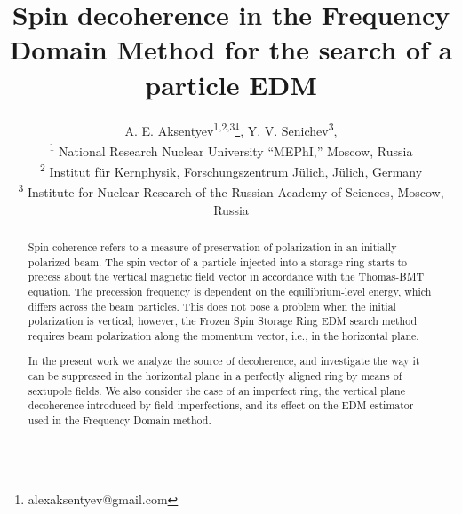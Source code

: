 \documentclass[a4paper]{jacow}
\begin{document}
\title{Spin decoherence in the Frequency Domain Method for the search of a particle EDM}
\author{A. E. Aksentyev\textsuperscript{1,2,3}\thanks{alexaksentyev@gmail.com},
  Y. V. Senichev\textsuperscript{3}, \\
  \textsuperscript{1} National Research Nuclear University ``MEPhI,'' Moscow, Russia \\
  \textsuperscript{2} Institut f\"ur Kernphysik, Forschungszentrum J\"ulich, J\"ulich, Germany\\
  \textsuperscript{3} Institute for Nuclear Research of the Russian Academy of Sciences, Moscow, Russia}
\maketitle

\begin{abstract}
  Spin coherence refers to a measure of preservation of polarization in an initially polarized beam.
  The spin vector of a particle injected into a storage ring starts to precess about
  the vertical magnetic field vector in accordance with the Thomas-BMT equation. The precession frequency
  is dependent on the equilibrium-level energy, which differs across the beam particles.
  This does not pose a problem when the initial polarization is vertical; however,
  the Frozen Spin Storage Ring EDM search method requires beam polarization along the momentum vector,
  i.e., in the horizontal plane. 
  
  In the present work we analyze the source of decoherence, and investigate the way it can be suppressed
  in the horizontal plane in a perfectly aligned ring by means of sextupole fields. We also consider
  the case of an imperfect ring, the vertical plane decoherence introduced by field imperfections,
  and its effect on the EDM estimator used in the Frequency Domain method.
\end{abstract}
\end{document}
